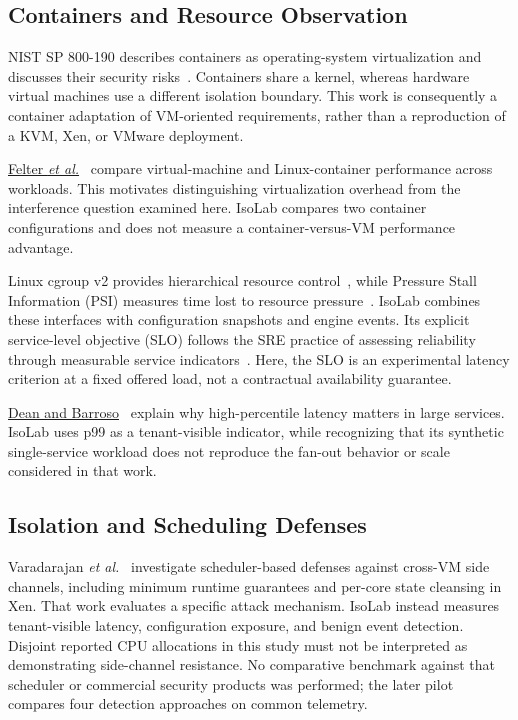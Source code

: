 \documentclass[conference,letterpaper]{IEEEtran}
\begin{document}
\subsection{Containers and Resource Observation}
NIST SP 800-190 describes containers as operating-system virtualization and discusses their security risks~\cite{nist}. Containers share a kernel, whereas hardware virtual machines use a different isolation boundary. This work is consequently a container adaptation of VM-oriented requirements, rather than a reproduction of a KVM, Xen, or VMware deployment.

\href{https://doi.org/10.1109/ISPASS.2015.7095802}{Felter \emph{et al.}}~\cite{felter} compare virtual-machine and Linux-container performance across workloads. This motivates distinguishing virtualization overhead from the interference question examined here. IsoLab compares two container configurations and does not measure a container-versus-VM performance advantage.

Linux cgroup v2 provides hierarchical resource control~\cite{cgroup}, while Pressure Stall Information (PSI) measures time lost to resource pressure~\cite{psi}. IsoLab combines these interfaces with configuration snapshots and engine events. Its explicit service-level objective (SLO) follows the SRE practice of assessing reliability through measurable service indicators~\cite{sre}. Here, the SLO is an experimental latency criterion at a fixed offered load, not a contractual availability guarantee.

\href{https://research.google/pubs/the-tail-at-scale/}{Dean and Barroso}~\cite{tail} explain why high-percentile latency matters in large services. IsoLab uses p99 as a tenant-visible indicator, while recognizing that its synthetic single-service workload does not reproduce the fan-out behavior or scale considered in that work.

\subsection{Isolation and Scheduling Defenses}
Varadarajan \emph{et al.}~\cite{scheduler} investigate scheduler-based defenses against cross-VM side channels, including minimum runtime guarantees and per-core state cleansing in Xen. That work evaluates a specific attack mechanism. IsoLab instead measures tenant-visible latency, configuration exposure, and benign event detection. Disjoint reported CPU allocations in this study must not be interpreted as demonstrating side-channel resistance. No comparative benchmark against that scheduler or commercial security products was performed; the later pilot compares four detection approaches on common telemetry.
\end{document}
